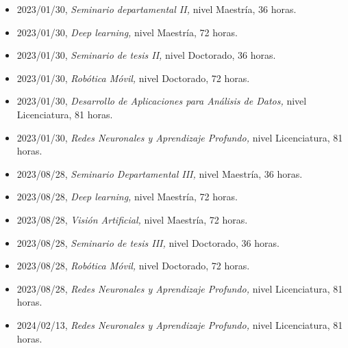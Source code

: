 \begin{itemize} 
\item 2023/01/30, \textit{ Seminario departamental II,} nivel Maestría, 36 horas. 
\item 2023/01/30, \textit{ Deep learning,} nivel Maestría, 72 horas. 
\item 2023/01/30, \textit{ Seminario de tesis II,} nivel Doctorado, 36 horas. 
\item 2023/01/30, \textit{ Robótica Móvil,} nivel Doctorado, 72 horas. 
\item 2023/01/30, \textit{ Desarrollo de Aplicaciones para Análisis de Datos,} nivel Licenciatura, 81 horas. 
\item 2023/01/30, \textit{ Redes Neuronales y Aprendizaje Profundo,} nivel Licenciatura, 81 horas. 
\item 2023/08/28, \textit{ Seminario Departamental III,} nivel Maestría, 36 horas. 
\item 2023/08/28, \textit{ Deep learning,} nivel Maestría, 72 horas. 
\item 2023/08/28, \textit{ Visión Artificial,} nivel Maestría, 72 horas. 
\item 2023/08/28, \textit{ Seminario de tesis III,} nivel Doctorado, 36 horas. 
\item 2023/08/28, \textit{ Robótica Móvil,} nivel Doctorado, 72 horas. 
\item 2023/08/28, \textit{ Redes Neuronales y Aprendizaje Profundo,} nivel Licenciatura, 81 horas. 
\item 2024/02/13, \textit{ Redes Neuronales y Aprendizaje Profundo,} nivel Licenciatura, 81 horas. 
\end{itemize} 
